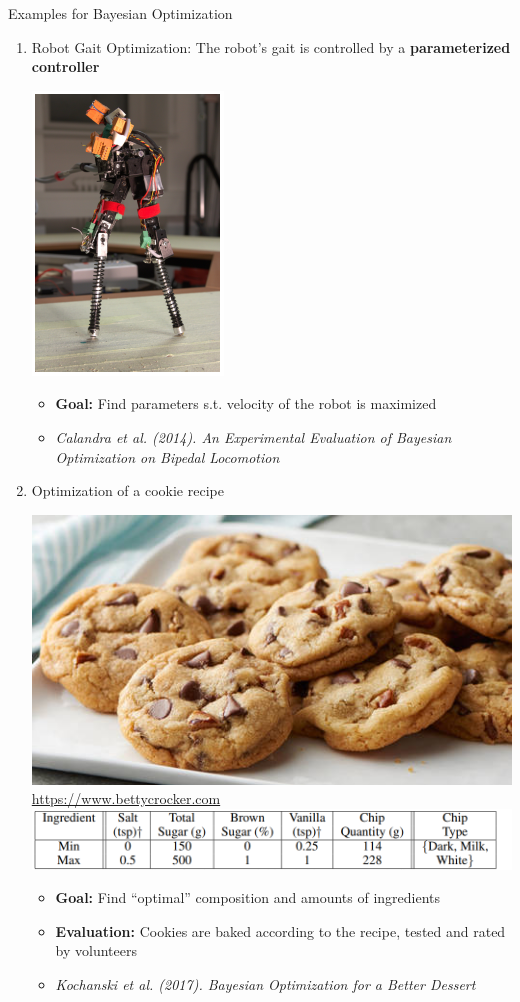 \documentclass[11pt,compress,t,notes=noshow, xcolor=table]{beamer}
\begin{document}
\begin{vbframe}{Examples for Bayesian Optimization} 
\begin{enumerate}
\item Robot Gait Optimization: The robot's gait is controlled by a \textbf{parameterized controller}

\medskip

\begin{center}
\includegraphics[width = 2.5 cm]{figure_man/robot_gait.png}\\
\end{center}
\begin{footnotesize}
\begin{itemize}
\item \textbf{Goal: } Find parameters s.t. velocity of the robot is maximized
\item \emph{Calandra et al. (2014). An Experimental Evaluation of Bayesian Optimization on Bipedal Locomotion}
\end{itemize}
\end{footnotesize}

\framebreak 

\item Optimization of a cookie recipe
\medskip

\begin{center}
\includegraphics[width = 5 cm]{figure_man/cookie.jpg}\\
\tiny{\url{https://www.bettycrocker.com}} \\
\includegraphics[width = 8 cm]{figure_man/cookie2.png}
\end{center}
\begin{itemize}
\item \textbf{Goal: } Find \enquote{optimal} composition and amounts of ingredients 
\item \textbf{Evaluation: } Cookies are baked according to the recipe, tested and rated by volunteers
\item \emph{Kochanski et al. (2017). Bayesian Optimization for a Better Dessert}
\end{itemize}

\end{enumerate}
\end{vbframe}
\end{document}

